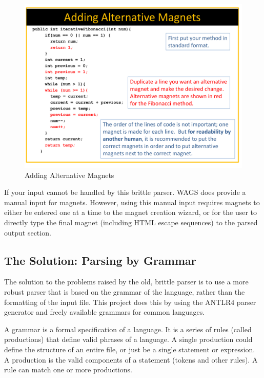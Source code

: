 \documentclass[letter,10pt]{article}
\begin{document}
\begin{figure}
 \centering
 
\includegraphics[width=.8\linewidth,keepaspectratio=true
  ]{./images/CreatingCodeMagnetLab/old_parser_presentation-09.png}
 \caption{Adding Alternative Magnets}
 \label{fig:old_parser_alts}
\end{figure}

If your input cannot be handled by this brittle parser. WAGS does 
provide a manual input for magnets. However, using this manual input 
requires magnets to either be entered one at a time to the magnet 
creation wizard, or for the user to directly type the final magnet 
(including HTML escape sequences) to the parsed output section. 


\subsection{The Solution: Parsing by Grammar}

The solution to the problems raised by the old, brittle parser is to 
use a more robust parser that is based on the grammar of the language, 
rather than the formatting of the input file. This project does this by 
using the ANTLR4 parser generator\cite{antlr-reference} and freely 
available grammars for common languages\cite{antlr-grammars-project}.

A grammar is a formal specification of a language. It is a series of 
rules (called productions) that define valid phrases of a language. A 
single production could define the structure of an entire file, or just 
be a single statement or expression. A production is the valid 
components of a statement (tokens and other rules). A rule can match 
one or more productions.
\end{document}
